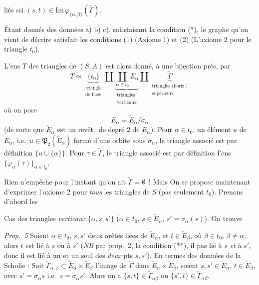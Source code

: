 \documentclass[11pt,a4paper]{article}
\begin{document}
liés ssi $(s,t)\in\mathrm{Im}\,\varphi_{\{\alpha,\beta\}}(\widetilde{\Gamma})$.

Étant donnés des données a) b) c), satisfaisant la condition (*), le graphe qu'on vient de décrire satisfait les conditions (1) (Axiome 1) et (2) (L'axiome 2 pour le  triangle $t_0$).

L'ens $T$ des triangles de $(S,A)$ est alors donné, à une bijection près, par
\[
  T\simeq\underbrace{\{t_0\}}_{\substack{\text{triangle}\\ \text{de base}}}\amalg\underbrace{\coprod_{\alpha\in t_0}E_{\alpha}}_{\substack{\text{triangles}\\ \text{verticaux}}}\amalg\underbrace{\widetilde{\Gamma}}_{\substack{\text{triangles (horiz.)}\\ \text{supérieurs}}}
\]
où on pose \struck{\ill{}}
\[
  E_{\alpha}=\widetilde{E}_{\alpha}/\sigma_{\alpha}
\]
(de sorte que $\widetilde{E}_{\alpha}$ est un revêt.\ de degré 2 de $E_{\alpha}$). Pour $\alpha\in t_0$, un élément $u$ de $E_{\alpha}$, i.e.\ $u\in\mathfrak{P}_2(\widetilde{E}_{\alpha})$ formé d'une orbite sous $\sigma_{\alpha}$,  le triangle associé est par définition $\{u\cup\{\alpha\}\}$. Pour \struck{\ill{}} $\tau\in\widetilde{\Gamma}$, le triangle associé est par définition l'ens $\{\varphi_{\alpha}(\tau)\}_{\alpha\in t_0}$.

Rien n'empêche pour l'instant qu'on ait $\widetilde{\Gamma}=\emptyset$~! Mais On se propose maintenant d'exprimer l'axiome 2 pour \emph{tous} les triangles de $S$ (pas seulement $t_0$). Prenons d'abord les

Cas des triangles \emph{verticaux} $\{\alpha,s,s'\}$ ($\alpha\in t_0$, $s\in\widetilde{E}_{\alpha}$, $s'=\sigma_{\alpha}(s)$). On trouve

\emph{Prop.~5} Soient $\alpha\in t_0$, $s,s'$ deux arêtes liées de $\widetilde{E}_{\alpha}$, et  $t\in\widetilde{E}_{\beta}$, où $\beta\in t_0$, $\beta\neq\alpha$, alors $t$ est lié à  $s$ ou à $s'$ (\emph{NB} par prop.~2,  la condition (**), il  pas lié  à $s$ \emph{et} à $s'$, donc il est lié à un et un seul des \emph{deux} pts $s,s'$). En termes des données de la Scholie : Soit $\widetilde{\Gamma}_{\alpha,\beta}\subset\widetilde{E}_{\alpha}\times\widetilde{E}_{\beta}$ l'image de $\widetilde{\Gamma}$ dans $\widetilde{E}_{\alpha}\times\widetilde{E}_{\beta}$, soient $s,s'\in\widetilde{E}_{\alpha}$, $t\in\widetilde{E}_{\beta}$, avec $s'=\sigma_{\alpha}s$ i.e.\ $s=\sigma_{\alpha}s'$. Alors on a $\{s,t\}\in\widetilde{\Gamma}_{\alpha\beta}$ ou $\{s',t\}\in\widetilde{\Gamma}_{\alpha\beta}$.
\end{document}
